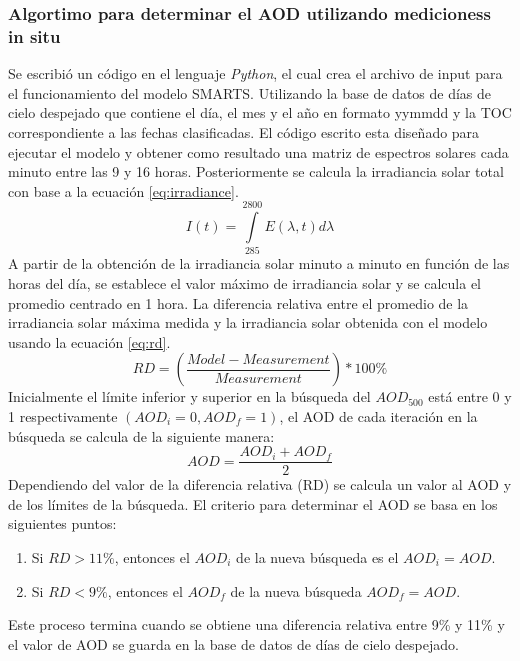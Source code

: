 \subsubsection{Algortimo para determinar el AOD utilizando medicioness in situ}
Se escribió un código en el lenguaje \textit{Python}, el cual crea el archivo de input para el funcionamiento del modelo SMARTS. Utilizando la base de datos de días de cielo despejado que contiene el día, el mes y el año en formato yymmdd y la TOC correspondiente a las fechas clasificadas. El código escrito esta diseñado para ejecutar el modelo y obtener como resultado una matriz de espectros solares cada minuto entre las 9 y 16 horas. Posteriormente se calcula la irradiancia solar total con base a la ecuación \ref{eq:irradiance}.
\begin{equation}
    I(t) = \int\limits_{285}^{2800} E(\lambda,t) d\lambda
    \label{eq:irradiance}
\end{equation}
A partir de la obtención de la irradiancia solar minuto a minuto en función de las horas del día, se establece el valor máximo de irradiancia solar y se calcula el promedio centrado en 1 hora. La diferencia relativa entre el promedio de la irradiancia solar máxima medida y la irradiancia solar obtenida con el modelo usando la ecuación \ref{eq:rd}.
\begin{equation}
    RD = \left(\frac{Model-Measurement}{Measurement}\right)*100\%
    \label{eq:rd}
\end{equation}
Inicialmente el límite inferior y superior en la búsqueda del $AOD_{500}$ está entre 0 y 1 respectivamente $(AOD_i=0, AOD_f=1)$, el AOD de cada iteración en la búsqueda se calcula de la siguiente manera:
\begin{equation*}
    AOD=\frac{AOD_i+AOD_f}{2}
\end{equation*}
Dependiendo del valor de la diferencia relativa (RD) se calcula un valor al AOD y de los límites de la búsqueda. El criterio para determinar el AOD se basa en los siguientes puntos:
\begin{enumerate}
    \item Si $RD>11\%$, entonces el $AOD_i$ de la nueva búsqueda es el $AOD_i=AOD$.
    \item Si $RD<9\%$, entonces el $AOD_f$ de la nueva búsqueda $AOD_f=AOD$.
\end{enumerate}
Este proceso termina cuando se obtiene una diferencia relativa entre 9\% y 11\% y el valor de AOD se guarda en la base de datos de días de cielo despejado.